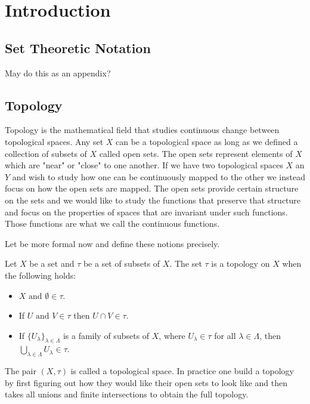 \chapter{Introduction}
\label{chapter2}

\section{Set Theoretic Notation}
May do this as an appendix?

\section{Topology}

Topology is the mathematical field that studies continuous change between topological spaces. Any set $X$ can be a topological space as long as we defined a collection of subsets of $X$ called open sets. The open sets represent elements of $X$ which are "near" or "close" to one another. If we have two topological spaces $X$ an $Y$ and wish to study how one can be continuously mapped to the other we instead focus on how the open sets are mapped. The open sets provide certain structure on the sets and we would like to study the functions that preserve that structure and focus on the properties of spaces that are invariant under such functions. Those functions are what we call the continuous functions.

Let be more formal now and define these notions precisely.

\begin{defn} Let $X$ be a set and $\tau$ be a set of subsets of $X$. The set $\tau$ is a topology on $X$ when the following holds:  \end{defn}

\begin{itemize}
    \item $X \text{ and } \emptyset \in \tau$.
    \item If $U \text{ and } V \in \tau$ then $U \cap V \in \tau$.
    \item If $\{U_\lambda\}_{\lambda \in \Lambda}$ is a family of subsets of $X$, where $U_\lambda \in \tau$ for all $\lambda \in \Lambda$, then 
        $\bigcup_{\lambda \in \Lambda}{U_\lambda} \in \tau$.
\end{itemize}

The pair $(X, \tau)$ is called a topological space. In practice one build a topology by first figuring out how they would like their open sets to look like and then takes all unions and finite intersections to obtain the full topology.

